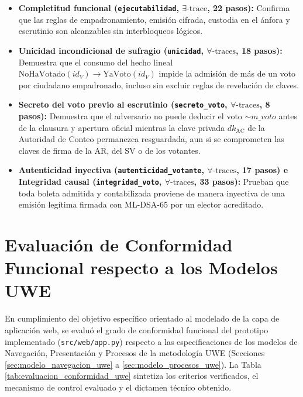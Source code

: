 \begin{itemize}
	\item \textbf{Completitud funcional (\texttt{ejecutabilidad}, $\exists\text{-trace}$, 22 pasos):} Confirma que las reglas de empadronamiento, emisión cifrada, custodia en el ánfora y escrutinio son alcanzables sin interbloqueos lógicos.
	\item \textbf{Unicidad incondicional de sufragio (\texttt{unicidad}, $\forall\text{-traces}$, 18 pasos):} Demuestra que el consumo del hecho lineal $\text{NoHaVotado}(id_V) \to \text{YaVoto}(id_V)$ impide la admisión de más de un voto por ciudadano empadronado, incluso sin excluir reglas de revelación de claves.
	\item \textbf{Secreto del voto previo al escrutinio (\texttt{secreto\_voto}, $\forall\text{-traces}$, 8 pasos):} Demuestra que el adversario no puede deducir el voto $\sim\!m\_voto$ antes de la clausura y apertura oficial mientras la clave privada $dk_{\text{AC}}$ de la Autoridad de Conteo permanezca resguardada, aun si se comprometen las claves de firma de la AR, del SV o de los votantes.
	\item \textbf{Autenticidad inyectiva (\texttt{autenticidad\_votante}, $\forall\text{-traces}$, 17 pasos) e Integridad causal (\texttt{integridad\_voto}, $\forall\text{-traces}$, 33 pasos):} Prueban que toda boleta admitida y contabilizada proviene de manera inyectiva de una emisión legítima firmada con ML-DSA-65 por un elector acreditado.
\end{itemize}

\section{Evaluación de Conformidad Funcional respecto a los Modelos UWE}
\label{sec:eval_conformidad_uwe_cap4}

En cumplimiento del objetivo específico orientado al modelado de la capa de aplicación web, se evaluó el grado de conformidad funcional del prototipo implementado (\texttt{src/web/app.py}) respecto a las especificaciones de los modelos de Navegación, Presentación y Procesos de la metodología UWE (Secciones \ref{sec:modelo_navegacion_uwe} a \ref{sec:modelo_procesos_uwe}). La Tabla \ref{tab:evaluacion_conformidad_uwe} sintetiza los criterios verificados, el mecanismo de control evaluado y el dictamen técnico obtenido.

